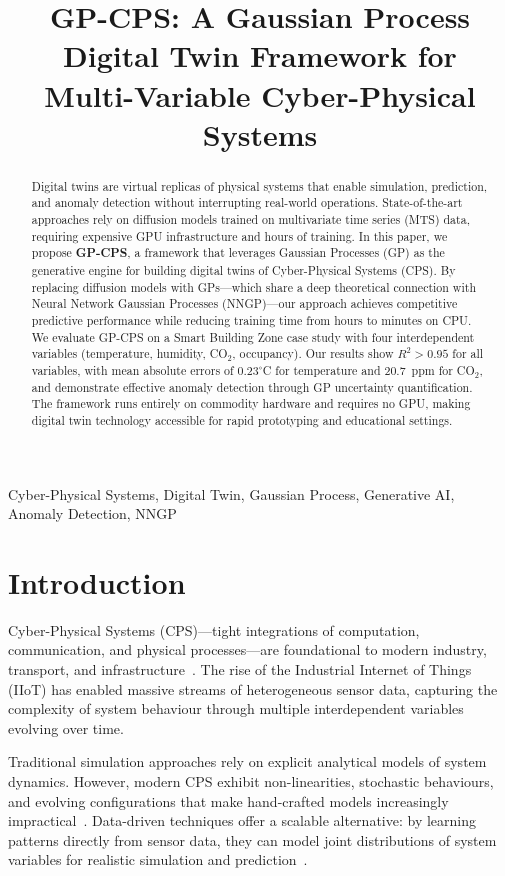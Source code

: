 \documentclass[conference]{IEEEtran}
\title{GP-CPS: A Gaussian Process Digital Twin Framework for\\ Multi-Variable Cyber-Physical Systems}
\author{\IEEEauthorblockN{J. Calataiut-Cl\raisebox{0.5mm}{\noindent\rule{3mm}{0.5pt}}i\raisebox{0.5mm}{\noindent\rule{3mm}{0.5pt}}}
\IEEEauthorblockA{Department of Advanced Mathematics\\
Universidad Politécnica\\
Email: jcalataiut-cli@github.com}
}
\begin{document}
\maketitle

\begin{abstract}
Digital twins are virtual replicas of physical systems that enable simulation, prediction, and anomaly detection without interrupting real-world operations. State-of-the-art approaches rely on diffusion models trained on multivariate time series (MTS) data, requiring expensive GPU infrastructure and hours of training. In this paper, we propose \textbf{GP-CPS}, a framework that leverages Gaussian Processes (GP) as the generative engine for building digital twins of Cyber-Physical Systems (CPS). By replacing diffusion models with GPs---which share a deep theoretical connection with Neural Network Gaussian Processes (NNGP)---our approach achieves competitive predictive performance while reducing training time from hours to minutes on CPU. We evaluate GP-CPS on a Smart Building Zone case study with four interdependent variables (temperature, humidity, CO$_2$, occupancy). Our results show $R^2 > 0.95$ for all variables, with mean absolute errors of $0.23^\circ$C for temperature and 20.7~ppm for CO$_2$, and demonstrate effective anomaly detection through GP uncertainty quantification. The framework runs entirely on commodity hardware and requires no GPU, making digital twin technology accessible for rapid prototyping and educational settings.
\end{abstract}

\begin{IEEEkeywords}
Cyber-Physical Systems, Digital Twin, Gaussian Process, Generative AI, Anomaly Detection, NNGP
\end{IEEEkeywords}

\section{Introduction}
\label{sec:introduction}

Cyber-Physical Systems (CPS)---tight integrations of computation, communication, and physical processes---are foundational to modern industry, transport, and infrastructure~\cite{lee2015, zhang2022}. The rise of the Industrial Internet of Things (IIoT) has enabled massive streams of heterogeneous sensor data, capturing the complexity of system behaviour through multiple interdependent variables evolving over time.

Traditional simulation approaches rely on explicit analytical models of system dynamics. However, modern CPS exhibit non-linearities, stochastic behaviours, and evolving configurations that make hand-crafted models increasingly impractical~\cite{yaacoub2020}. Data-driven techniques offer a scalable alternative: by learning patterns directly from sensor data, they can model joint distributions of system variables for realistic simulation and prediction~\cite{yuan2019}.
\end{document}

